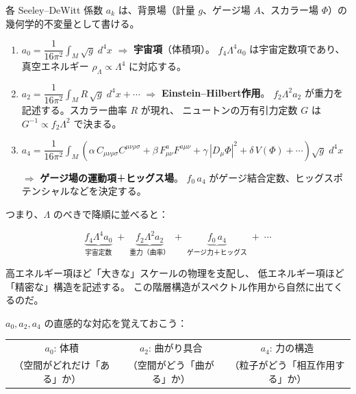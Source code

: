 各 Seeley--DeWitt 係数 $a_k$ は、背景場（計量 $g$、ゲージ場 $A$、スカラー場 $\Phi$）の
幾何学的不変量として書ける。

\begin{keybox}
\begin{enumerate}
  \item $a_0 = \dfrac{1}{16\pi^2}\displaystyle\int_M \sqrt{g}\; d^4x$
  \quad $\Longrightarrow$ \quad\textbf{宇宙項}（体積項）。
  $f_4\Lambda^4 a_0$ は宇宙定数項であり、
  真空エネルギー $\rho_\Lambda \propto \Lambda^4$ に対応する。

  \item $a_2 = \dfrac{1}{16\pi^2}\displaystyle\int_M R\,\sqrt{g}\; d^4x + \cdots$
  \quad $\Longrightarrow$ \quad\textbf{Einstein--Hilbert作用}。
  $f_2\Lambda^2 a_2$ が重力を記述する。スカラー曲率 $R$ が現れ、
  ニュートンの万有引力定数 $G$ は $G^{-1} \propto f_2 \Lambda^2$ で決まる。

  \item $a_4 = \dfrac{1}{16\pi^2}\displaystyle\int_M
  \left(\alpha\, C_{\mu\nu\rho\sigma}C^{\mu\nu\rho\sigma}
        + \beta\, F_{\mu\nu}^a F^{a\mu\nu}
        + \gamma\, |D_\mu\Phi|^2
        + \delta\, V(\Phi)
        + \cdots\right)\sqrt{g}\; d^4x$

  $\Longrightarrow$ \quad\textbf{ゲージ場の運動項}＋\textbf{ヒッグス場}。
  $f_0\, a_4$ がゲージ結合定数、ヒッグスポテンシャルなどを決定する。
\end{enumerate}
\end{keybox}

\noindent つまり、$\Lambda$ のべきで降順に並べると：

\[
  \underbrace{f_4\Lambda^4 a_0}_{\text{宇宙定数}}
  \;+\; \underbrace{f_2\Lambda^2 a_2}_{\text{重力（曲率）}}
  \;+\; \underbrace{f_0\, a_4}_{\text{ゲージ力＋ヒッグス}}
  \;+\; \cdots
\]

高エネルギー項ほど「大きな」スケールの物理を支配し、
低エネルギー項ほど「精密な」構造を記述する。
この階層構造がスペクトル作用から自然に出てくるのだ。

\begin{hsbox}
$a_0, a_2, a_4$ の直感的な対応を覚えておこう：
\begin{center}
\begin{tabular}{ccc}
  $a_0$: 体積 & $a_2$: 曲がり具合 & $a_4$: 力の構造 \\
  （空間がどれだけ「ある」か） & （空間がどう「曲がる」か） & （粒子がどう「相互作用する」か）
\end{tabular}
\end{center}
\end{hsbox}

